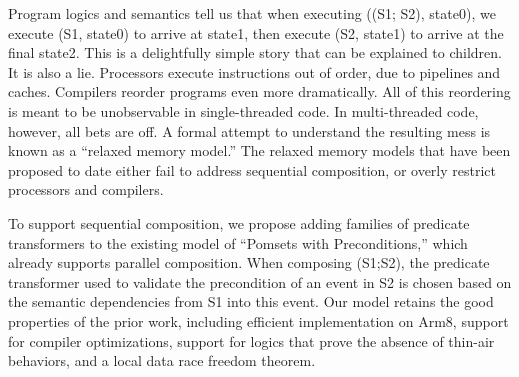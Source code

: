 
Program logics and semantics tell us that when executing ((S1; S2), state0),
we execute (S1, state0) to arrive at state1, then execute (S2, state1) to
arrive at the final state2.  This is a delightfully simple story that can be
explained to children.  It is also a lie.
%
Processors execute instructions out of order, due to pipelines and caches.
Compilers reorder programs even more dramatically.  All of this reordering is
meant to be unobservable in single-threaded code.  In multi-threaded code,
however, all bets are off.  A formal attempt to understand the resulting mess
is known as a ``relaxed memory model.''  The relaxed memory models that have
been proposed to date either fail to address sequential composition, or
overly restrict processors and compilers.

To support sequential composition, we propose adding families of predicate
transformers to the existing model of ``Pomsets with Preconditions,'' which
already supports parallel composition.  When composing (S1;S2), the predicate
transformer used to validate the precondition of an event in S2 is chosen
based on the semantic dependencies from S1 into this event.  Our model
retains the good properties of the prior work, including efficient
implementation on Arm8, support for compiler optimizations, support for
logics that prove the absence of thin-air behaviors, and a local data race
freedom theorem.
